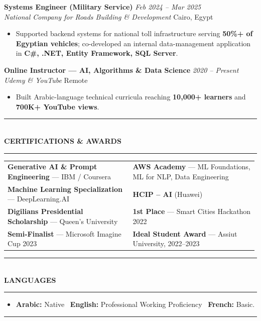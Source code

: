 \documentclass[10pt, a4paper]{article}
\makeatletter
\newcommand{\cvsection}[1]{%
  \vspace{3pt}%
  {\color{navy}\rule{\linewidth}{1.1pt}}\\[0.5pt]%
  {\color{navy}\bfseries\fontsize{9.5}{11}\selectfont\uppercase{#1}}\\[-4pt]%
  {\color{teal}\rule{\linewidth}{0.6pt}}%
  \vspace{2pt}%
}
\newcommand{\cventry}[4]{%
  \vspace{2.5pt}%
  \textbf{\color{darkgray}#1} \hfill {\color{midgray}\textit{#3}}\\[-1.5pt]%
  {\color{teal}\textit{#2}} \hfill {\color{midgray}#4}%
}
\newenvironment{cvitems}{%
  \begin{itemize}[leftmargin=11pt, itemsep=0.5pt, parsep=0pt, topsep=1pt,
                  label={\textcolor{teal}{$\bullet$}}]
}{%
  \end{itemize}%
}
\newenvironment{dualcol}{%
  \begin{tabular*}{\linewidth}{@{}p{0.495\linewidth}@{\hspace{0.01\linewidth}}p{0.495\linewidth}@{}}
}{%
  \end{tabular*}%
}
\makeatother
\begin{document}
\cventry{Systems Engineer (Military Service)}{National Company for Roads Building \& Development}
        {Feb 2024 -- Mar 2025}{Cairo, Egypt}
\begin{cvitems}
  \item Supported backend systems for national toll infrastructure serving \textbf{50\%+ of Egyptian vehicles}; co-developed an internal data-management application in \textbf{C\#, .NET, Entity Framework, SQL Server}.
\end{cvitems}

\cventry{Online Instructor --- AI, Algorithms \& Data Science}{Udemy \& YouTube}
        {2020 -- Present}{Remote}
\begin{cvitems}
  \item Built Arabic-language technical curricula reaching \textbf{10,000+ learners} and \textbf{700K+ YouTube views}.
\end{cvitems}

\cvsection{Certifications \& Awards}

\begin{dualcol}
  \textbf{Generative AI \& Prompt Engineering} --- IBM / Coursera &
  \textbf{AWS Academy} --- ML Foundations, ML for NLP, Data Engineering \\[2pt]
  \textbf{Machine Learning Specialization} --- DeepLearning.AI &
  \textbf{HCIP -- AI} (Huawei) \\[2pt]
  \textbf{Digilians Presidential Scholarship} --- Queen's University &
  \textbf{1st Place} --- Smart Cities Hackathon 2022 \\[2pt]
  \textbf{Semi-Finalist} --- Microsoft Imagine Cup 2023 &
  \textbf{Ideal Student Award} --- Assiut University, 2022--2023 \\
\end{dualcol}

\cvsection{Languages}

\begin{cvitems}
  \item \textbf{Arabic:} Native \textperiodcentered\ \textbf{English:} Professional Working Proficiency \textperiodcentered\ \textbf{French:} Basic.
\end{cvitems}

\vspace{3pt}
{\color{navy}\rule{\linewidth}{0.8pt}}
\end{document}
